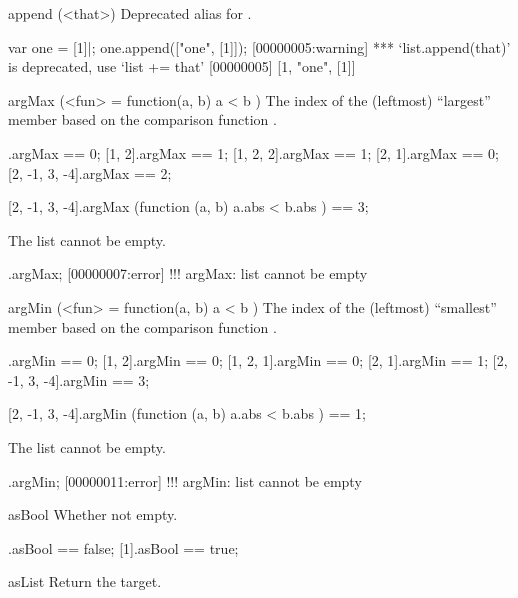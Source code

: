 \begin{urbiscriptapi}
\item[append](<that>)%
  Deprecated alias for .

\begin{urbiscript}
var one = [1]|;
one.append(["one", [1]]);
[00000005:warning] *** `list.append(that)' is deprecated, use `list += that'
[00000005] [1, "one", [1]]
\end{urbiscript}

\item[argMax](<fun> = function(a, b) { a < b })%
  The index of the (leftmost) ``largest'' member based on the comparison
  function .
\begin{urbiassert}
           [1].argMax == 0;
        [1, 2].argMax == 1;
     [1, 2, 2].argMax == 1;
        [2, 1].argMax == 0;
[2, -1, 3, -4].argMax == 2;

[2, -1, 3, -4].argMax (function (a, b) { a.abs < b.abs }) == 3;
\end{urbiassert}

The list cannot be empty.

\begin{urbiscript}
[].argMax;
[00000007:error] !!! argMax: list cannot be empty
\end{urbiscript}


\item[argMin](<fun> = function(a, b) { a < b })%
  The index of the (leftmost) ``smallest'' member based on the comparison
  function .
\begin{urbiassert}
           [1].argMin == 0;
        [1, 2].argMin == 0;
     [1, 2, 1].argMin == 0;
        [2, 1].argMin == 1;
[2, -1, 3, -4].argMin == 3;

[2, -1, 3, -4].argMin (function (a, b) { a.abs < b.abs }) == 1;
\end{urbiassert}

The list cannot be empty.

\begin{urbiscript}
[].argMin;
[00000011:error] !!! argMin: list cannot be empty
\end{urbiscript}

\item[asBool]
  Whether not empty.
\begin{urbiassert}
[].asBool == false;
[1].asBool == true;
\end{urbiassert}

\item[asList]
  Return the target.


\end{urbiscriptapi}
